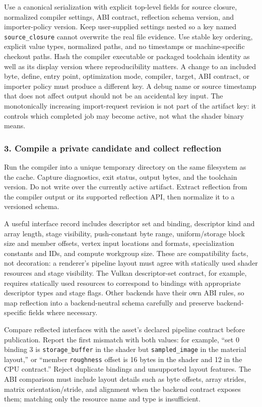 Use a canonical serialization with explicit top-level fields for source closure, normalized compiler settings, ABI contract, reflection schema version, and importer-policy version. Keep user-supplied settings nested so a key named \texttt{source\_closure} cannot overwrite the real file evidence. Use stable key ordering, explicit value types, normalized paths, and no timestamps or machine-specific checkout paths. Hash the compiler executable or packaged toolchain identity as well as its display version where reproducibility matters. A change to an included byte, define, entry point, optimization mode, compiler, target, ABI contract, or importer policy must produce a different key. A debug name or source timestamp that does not affect output should not be an accidental key input. The monotonically increasing import-request revision is not part of the artifact key: it controls which completed job may become active, not what the shader binary means.

\subsubsection{3. Compile a private candidate and collect reflection}\label{05-engine-i-ch010-compile-a-private-candidate-and-collect-reflection}

Run the compiler into a unique temporary directory on the same filesystem as the cache. Capture diagnostics, exit status, output bytes, and the toolchain version. Do not write over the currently active artifact. Extract reflection from the compiler output or its supported reflection API, then normalize it to a versioned schema.

A useful interface record includes descriptor set and binding, descriptor kind and array length, stage visibility, push-constant byte range, uniform/storage block size and member offsets, vertex input locations and formats, specialization constants and IDs, and compute workgroup size. These are compatibility facts, not decoration: a renderer's pipeline layout must agree with statically used shader resources and stage visibility. The Vulkan descriptor-set contract, for example, requires statically used resources to correspond to bindings with appropriate descriptor types and stage flags. Other backends have their own ABI rules, so map reflection into a backend-neutral schema carefully and preserve backend-specific fields where necessary.

Compare reflected interfaces with the asset's declared pipeline contract before publication. Report the first mismatch with both values: for example, ``set 0 binding 3 is \texttt{storage\_buffer} in the shader but \texttt{sampled\_image} in the material layout,'' or ``member \texttt{roughness} offset is 16 bytes in the shader and 12 in the CPU contract.'' Reject duplicate bindings and unsupported layout features. The ABI comparison must include layout details such as byte offsets, array strides, matrix orientation/stride, and alignment when the backend contract exposes them; matching only the resource name and type is insufficient.

